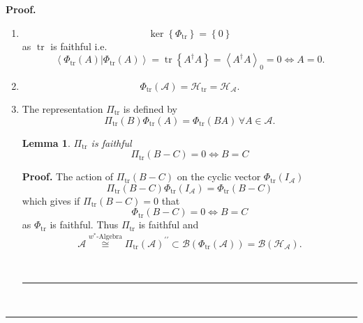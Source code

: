 \documentclass[aps,preprint]{revtex4}%
\newtheorem{lemma}[theorem]{Lemma}
\newenvironment{proof}[1][Proof]{\noindent\textbf{#1.} }{\ \rule{0.5em}{0.5em}}
\begin{document}
\begin{proof}
\begin{enumerate}
\item
\begin{equation}
\ker\left\{  \Phi_{\operatorname*{tr}}\right\}  =\left\{  0\right\}
\end{equation}
as $\operatorname*{tr}$ is faithful i.e.
\begin{equation}
\left\langle \left.  \Phi_{\operatorname*{tr}}\left(  A\right)  \right\vert
\Phi_{\operatorname*{tr}}\left(  A\right)  \right\rangle =\operatorname*{tr}%
\left\{  A^{\dagger}A\right\}  =\left\langle A^{\dagger}A\right\rangle
_{0}=0\Leftrightarrow A=0.
\end{equation}


\item
\begin{equation}
\Phi_{\operatorname*{tr}}\left(  \mathcal{A}\right)  =\mathcal{H}%
_{\operatorname*{tr}}=\mathcal{H}_{\mathcal{A}}.
\end{equation}


\item The representation $\Pi_{\operatorname*{tr}}$ is defined by
\begin{equation}
\Pi_{\operatorname*{tr}}\left(  B\right)  \Phi_{\operatorname*{tr}}\left(
A\right)  =\Phi_{\operatorname*{tr}}\left(  BA\right)  \,\forall
A\in\mathcal{A}.
\end{equation}


\begin{lemma}
$\Pi_{\operatorname*{tr}}$ is faithful%
\begin{equation}
\Pi_{\operatorname*{tr}}\left(  B-C\right)  =0\Leftrightarrow B=C
\end{equation}

\end{lemma}

\begin{proof}
The action of $\Pi_{\operatorname*{tr}}\left(  B-C\right)  $ on the cyclic
vector $\Phi_{\operatorname*{tr}}\left(  I_{\mathcal{A}}\right)  $
\begin{equation}
\Pi_{\operatorname*{tr}}\left(  B-C\right)  \Phi_{\operatorname*{tr}}\left(
I_{\mathcal{A}}\right)  =\Phi_{\operatorname*{tr}}\left(  B-C\right)
\end{equation}
which gives if $\Pi_{\operatorname*{tr}}\left(  B-C\right)  =0$ that
\begin{equation}
\Phi_{\operatorname*{tr}}\left(  B-C\right)  =0\Longleftrightarrow B=C
\end{equation}
as $\Phi_{\operatorname*{tr}}$ is faithful. Thus $\Pi_{\operatorname*{tr}}$ is
faithful and
\begin{equation}
\mathcal{A}\overset{w^{\ast}\text{-Algebra}}{\mathcal{\cong}}\Pi
_{\operatorname*{tr}}\left(  \mathcal{A}\right)  ^{\prime\prime}%
\subset\mathcal{B}\left(  \Phi_{\operatorname*{tr}}\left(  \mathcal{A}\right)
\right)  =\mathcal{B}\left(  \mathcal{H}_{\mathcal{A}}\right)  .
\end{equation}

\end{proof}
\end{enumerate}
\end{proof}
\end{document}
